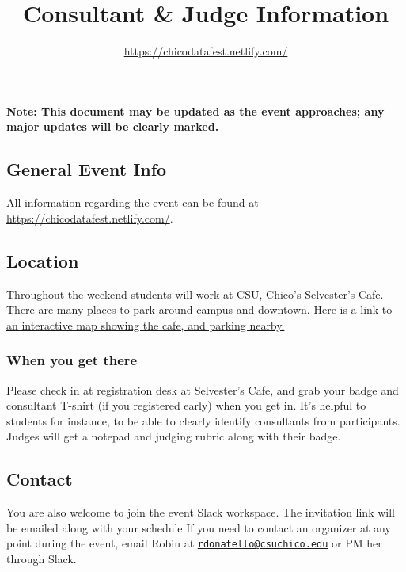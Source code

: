 \documentclass[]{article}
\title{Consultant \& Judge Information}
\subtitle{\url{https://chicodatafest.netlify.com/}}
\author{}
\date{}
\begin{document}
\maketitle

\textbf{Note: This document may be updated as the event approaches; any
major updates will be clearly marked.}

\hypertarget{general-event-info}{%
\subsection{General Event Info}\label{general-event-info}}

All information regarding the event can be found at
\url{https://chicodatafest.netlify.com/}.

\hypertarget{location}{%
\subsection{Location}\label{location}}

Throughout the weekend students will work at CSU, Chico's Selvester's
Cafe. There are many places to park around campus and downtown.
\href{https://www.csuchico.edu/maps/campus/?id=1193\#!m/316229?ce/0,31642,28505?ct/28506,36245,36247,36246,36473,36472,32703,32116,32115,32092,32068,32015,31198?mc/39.730033800326076,-121.84518098831178?z/17?lvl/0}{Here
is a link to an interactive map showing the cafe, and parking nearby.}

\hypertarget{when-you-get-there}{%
\subsubsection{When you get there}\label{when-you-get-there}}

Please check in at registration desk at Selvester's Cafe, and grab your
badge and consultant T-shirt (if you registered early) when you get in.
It's helpful to students for instance, to be able to clearly identify
consultants from participants. Judges will get a notepad and judging
rubric along with their badge.

\hypertarget{contact}{%
\subsection{Contact}\label{contact}}

You are also welcome to join the event Slack workspace. The invitation
link will be emailed along with your schedule If you need to contact an
organizer at any point during the event, email Robin at
\href{mailto:rdonatello@csuchico.edu}{\nolinkurl{rdonatello@csuchico.edu}}
or PM her through Slack.
\end{document}

